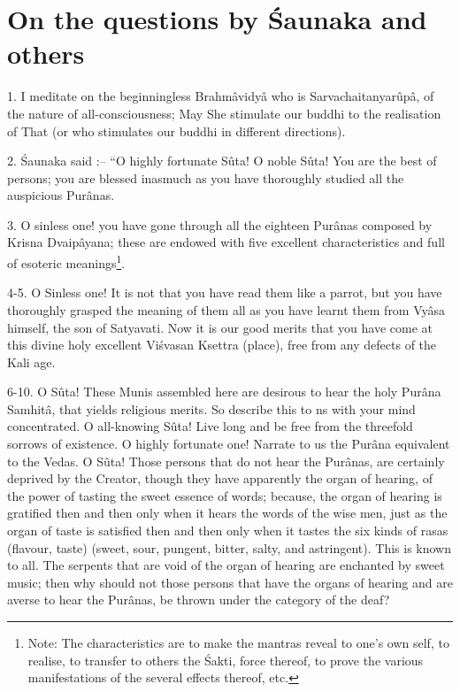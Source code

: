 \chapter[]{On the questions by \'Saunaka and others}
1. I meditate on the beginningless Brahm\^avidy\^a who is Sarvachaitanyar\^up\^a, of the nature of all-consciousness;  May She stimulate our buddhi to the realisation of That (or who stimulates our buddhi in different directions).

2. \'Saunaka said :-- “O highly fortunate S\^uta! O noble S\^uta! You are the best of persons; you are blessed inasmuch as you have thoroughly studied all the auspicious Pur\^anas.

3. O sinless one! you have gone through all the eighteen Pur\^anas composed by Krisna Dvaip\^ayana; these are endowed with five excellent characteristics and full of esoteric meanings\footnote{Note: The characteristics are to make the mantras reveal to one's own self, to realise, to transfer to others the \'Sakti, force thereof, to prove the various manifestations of the several effects thereof, etc.}.

4-5. O Sinless one! It is not that you have read them like a parrot, but you have thoroughly grasped the meaning of them all as you have learnt them from Vy\^asa himself, the son of Satyavati. Now it is our good merits that you have come at this divine holy excellent Vi\'svasan Ksettra (place), free from any defects of the Kali age.

6-10. O S\^uta! These Munis assembled here are desirous to hear the holy Pur\^ana Samhit\^a, that yields religious merits. So describe this to ns with your mind concentrated. O all-knowing S\^uta! Live long and be free from the threefold sorrows of existence. O highly fortunate one! Narrate to us the Pur\^ana equivalent to the Vedas. O S\^uta! Those persons that do  not hear the Pur\^anas, are certainly deprived by the Creator, though they have apparently the organ of hearing, of the power of tasting the sweet essence of words; because, the organ of hearing is gratified then and then only when it hears the words of the wise men, just as the organ of taste is satisfied then and then only when it tastes the six kinds of rasas (flavour, taste) (sweet, sour, pungent, bitter, salty, and astringent). This is known to all. The serpents that are void of the organ of hearing are enchanted by sweet music; then why should not those persons that have the organs of hearing and are averse to hear the Pur\^anas, be thrown under the category of the deaf? 

